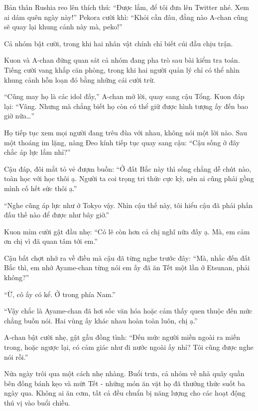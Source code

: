 \documentclass[../main.tex]{subfiles}
\begin{document}
Bản thân Rushia reo lên thích thú: ``Được lắm, để tôi đưa lên Twitter nhé. Xem ai dám quên ngày này!'' Pekora cười khì: ``Khỏi cần đâu, đằng nào A-chan cũng sẽ quay lại khung cảnh này mà, peko!''

Cả nhóm bật cười, trong khi hai nhân vật chính chỉ biết cúi đầu chịu trận.

Kuon và A-chan đứng quan sát cả nhóm đang pha trò sau bài kiểm tra toán. Tiếng cười vang khắp căn phòng, trong khi hai người quản lý chỉ có thể nhìn khung cảnh hỗn loạn đó bằng những cái cười trừ.

``Cũng may họ là các idol đấy,'' A-chan mở lời, quay sang cậu Tổng. Kuon đáp lại: ``Vâng. Nhưng mà chẳng biết họ còn có thể giữ được hình tượng ấy đến bao giờ nữa\dots''

Họ tiếp tục xem mọi người đang trêu đùa với nhau, không nói một lời nào. Sau một thoáng im lặng, nàng Đeo kính tiếp tục quay sang cậu: ``Cậu sống ở đây chắc áp lực lắm nhỉ?''

Cậu đáp, đôi mắt tỏ vẻ đượm buồn: ``Ở đất Bắc này thì sống chẳng dễ chút nào, toàn học với học thôi ạ. Người ta coi trọng tri thức cực kỳ, nên ai cũng phải gồng mình cố hết sức thôi ạ.''

``Nghe cũng áp lực như ở Tokyo vậy. Nhìn cậu thế này, tôi hiểu cậu đã phải phấn đấu thế nào để được như bây giờ.''

Kuon mỉm cười gật đầu nhẹ: ``Có lẽ còn hơn cả chị nghĩ nữa đấy ạ. Mà, em cảm ơn chị vì đã quan tâm tới em.''

Cậu bất chợt nhớ ra về điều mà cậu đã từng nghe trước đây: ``Mà, nhắc đến đất Bắc thì, em nhớ Ayame-chan từng nói em ấy đã ăn Tết một lần ở Etsunan, phải không?''

``Ừ, cô ấy có kể. Ở trong phía Nam.''

``Vậy chắc là Ayame-chan đã hơi sốc văn hóa hoặc cảm thấy quen thuộc đến mức chẳng buồn nói. Hai vùng ấy khác nhau hoàn toàn luôn, chị ạ.''

A-chan bật cười nhẹ, gật gầu đồng tình: ``Đến mức người miền ngoài ra miền trong, hoặc ngược lại, có cảm giác như đi nước ngoài ấy nhỉ? Tôi cũng được nghe nói rồi.''

Nửa ngày trôi qua một cách nhẹ nhàng. Buổi trưa, cả nhóm về nhà quây quần bên đống bánh kẹo và mứt Tết - những món ăn vặt họ đã thưởng thức suốt ba ngày qua. Không ai ăn cơm, tất cả đều chuẩn bị năng lượng cho các hoạt động thú vị vào buổi chiều.
\end{document}
